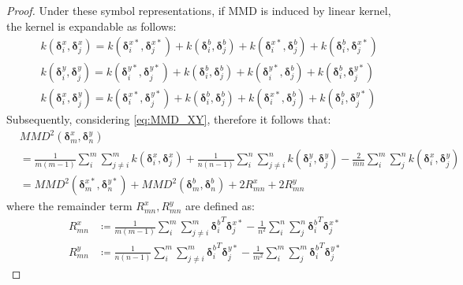 \documentclass{article}
\begin{document}
\begin{proof}
Under these symbol representations, if MMD is induced by linear kernel, the kernel is expandable as follows:
\begin{equation}
    \begin{aligned}
        & k(\bm{\delta}_i^x, \bm{\delta}_j^x) = k(\bm{\delta}_i^{x*}, \bm{\delta}_j^{x*}) + k(\bm{\delta}_i^b, \bm{\delta}_j^b) + k(\bm{\delta}_i^{x*}, \bm{\delta}_j^b) + k(\bm{\delta}_i^b, \bm{\delta}_j^{x*}) \\
        & k(\bm{\delta}_i^y, \bm{\delta}_j^y) = k(\bm{\delta}_i^{y*}, \bm{\delta}_j^{y*}) + k(\bm{\delta}_i^b, \bm{\delta}_j^b) + k(\bm{\delta}_i^{y*}, \bm{\delta}_j^b) + k(\bm{\delta}_i^b, \bm{\delta}_j^{y*}) \\
        & k(\bm{\delta}_i^x, \bm{\delta}_j^y) = k(\bm{\delta}_i^{x*}, \bm{\delta}_j^{y*}) + k(\bm{\delta}_i^b, \bm{\delta}_j^b) + k(\bm{\delta}_i^{x*}, \bm{\delta}_j^b) + k(\bm{\delta}_i^b, \bm{\delta}_j^{y*})
    \end{aligned}
\end{equation}
Subsequently, considering \eqref{eq:MMD_XY}, therefore it follows that:
\begin{equation}\label{eq:MMDMMD}
    \begin{aligned}
        & MMD^2\left(\bm{\delta}_m^x, \bm{\delta}_n^y\right) \\
        & = \frac{1}{m(m-1)}\sum_{i}^{m}\sum_{j\neq i}^{m}k(\bm{\delta}_i^x, \bm{\delta}_j^x) + \frac{1}{n(n-1)}\sum_{i}^{n}\sum_{j\neq i}^{n}k(\bm{\delta}_i^y, \bm{\delta}_j^y) - \frac{2}{mn}\sum_{i}^{m}\sum_{j}^{n}k(\bm{\delta}_i^x, \bm{\delta}_j^y) \\
        & = MMD^2\left(\bm{\delta}_m^{x*}, \bm{\delta}_n^{y*}\right) + MMD^2\left(\bm{\delta}_m^b, \bm{\delta}_n^b\right) + 2R_{mn}^x + 2R_{mn}^y
    \end{aligned}
\end{equation}
where the remainder term $R_{mn}^x, R_{mn}^y$ are defined as:
\begin{equation}
    \begin{aligned}
        R_{mn}^x & \coloneqq \frac{1}{m(m-1)}\sum_{i}^{m}\sum_{j\neq i}^{m}{\bm{\delta}_i^b}^T \bm{\delta}_j^{x*} - \frac{1}{n^2}\sum_{i}^{n}\sum_{j}^{n}{\bm{\delta}_i^b}^T \bm{\delta}_j^{x*} \\
        R_{mn}^y & \coloneqq \frac{1}{n(n-1)}\sum_{i}^{m}\sum_{j\neq i}^{m}{\bm{\delta}_i^b}^T \bm{\delta}_j^{y*} - \frac{1}{m^2}\sum_{i}^{m}\sum_{j}^{m}{\bm{\delta}_i^b}^T \bm{\delta}_j^{y*}
    \end{aligned}
\end{equation}


\end{proof}
\end{document}
